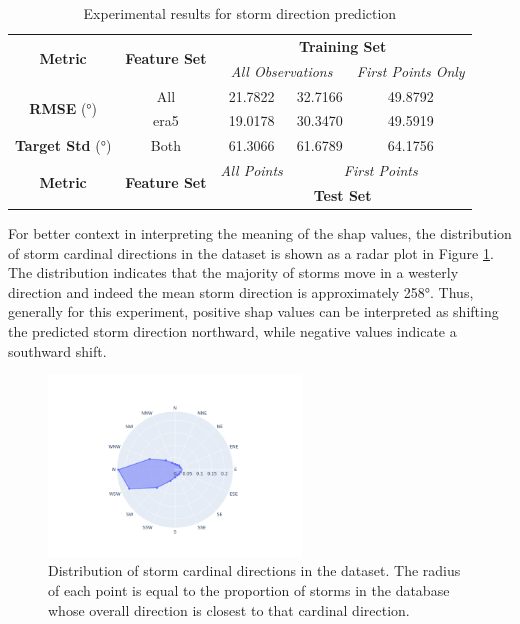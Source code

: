 \begin{table}[ht]
\centering
\caption{Experimental results for storm direction prediction}
\label{tab:storm_direction_results}
\begin{tabular}{|c|c|c|c|c|}
\hline
\multirow{2}{*}{\textbf{Metric}} & \multirow{2}{*}{\textbf{Feature Set}} & \multicolumn{3}{c|}{\textbf{Training Set} } \\ \cline{3-5}
 & & \multicolumn{2}{c|}{\textit{All Observations}} & \textit{First Points Only} \\
\hline \hline
\multirow{2}{*}{\textbf{RMSE} (\unit{\degree})} & All & 21.7822 & 32.7166 & 49.8792 \\
 & \acrshort{era5} & 19.0178 & 30.3470 & 49.5919 \\
\hline
\textbf{Target Std} (\unit{\degree}) & Both & 61.3066 & 61.6789 & 64.1756 \\
\hline \hline
\multirow{2}{*}{\textbf{Metric}} & \multirow{2}{*}{\textbf{Feature Set}} & \textit{All Points} & \multicolumn{2}{c|}{\textit{First Points}} \\ \cline{3-5}
 & & \multicolumn{3}{c|}{\textbf{Test Set}} \\ 
\hline
\end{tabular}
\end{table}

For better context in interpreting the meaning of the \acrshort{shap} values, the distribution of storm cardinal directions in the dataset is shown as a radar plot in Figure \ref{fig:storm_cardinal_directions_distribution}. The distribution indicates that the majority of storms move in a westerly direction and indeed the mean storm direction is approximately \ang{258}. Thus, generally for this experiment, positive \acrshort{shap} values can be interpreted as shifting the predicted storm direction northward, while negative values indicate a southward shift.

\begin{figure}[ht]
    \centering
    \includegraphics[width=0.6\textwidth]{../figures/generated/exploration/storm_cardinal_directions_distribution.png}
    \caption{Distribution of storm cardinal directions in the dataset. The radius of each point is equal to the proportion of storms in the database whose overall direction is closest to that cardinal direction.}
    \label{fig:storm_cardinal_directions_distribution}
\end{figure}

